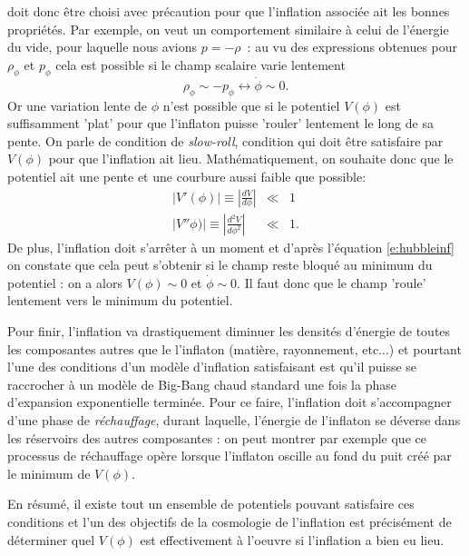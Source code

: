  doit donc être choisi avec précaution pour que l'inflation associée ait les bonnes propriétés. Par exemple, on veut un comportement similaire à celui de l'énergie du vide, pour laquelle nous avions $p=-\rho$~: au vu des expressions obtenues pour $\rho_\phi$ et $p_\phi$ cela est possible si le champ scalaire varie lentement
\begin{equation}
\rho_\phi\sim -p_\phi \leftrightarrow \dot \phi \sim 0.
\end{equation}
Or une variation lente de $\phi$ n'est possible que si le potentiel $V(\phi)$ est suffisamment 'plat' pour que l'inflaton puisse 'rouler' lentement le long de sa pente. On parle de condition de \textit{slow-roll}, condition qui doit être satisfaire par $V(\phi)$ pour que l'inflation ait lieu. Mathématiquement, on souhaite donc que le potentiel ait une pente et une courbure aussi faible que possible:
\begin{eqnarray}
|V'(\phi)|\equiv|\frac{d V}{d\phi}| &\ll& 1\\
|V''\phi)|\equiv|\frac{d ^2 V}{d\phi^2}| &\ll& 1.
\end{eqnarray}
De plus, l'inflation doit s'arrêter à un moment et d'après l'équation \ref{e:hubbleinf} on constate que cela peut s'obtenir si le champ reste bloqué au minimum du potentiel : on a alors $V(\phi)\sim 0$ et $\dot \phi \sim 0$. Il faut donc que le champ 'roule' lentement vers le minimum du potentiel. 

Pour finir, l'inflation va drastiquement diminuer les densités d'énergie de toutes les composantes autres que le l'inflaton (matière, rayonnement, etc...) et pourtant l'une des conditions d'un modèle d'inflation satisfaisant est qu'il puisse se raccrocher à un modèle de Big-Bang chaud standard une fois la phase d'expansion exponentielle terminée. Pour ce faire, l'inflation doit s'accompagner d'une phase de \textit{réchauffage}, durant laquelle, l'énergie de l'inflaton se déverse dans les réservoirs des autres composantes : on peut montrer par exemple que ce processus de réchauffage opère lorsque l'inflaton oscille au fond du puit créé par le minimum de $V(\phi)$.


En résumé, il existe tout un ensemble de potentiels pouvant satisfaire ces conditions et l'un des objectifs de la cosmologie de l'inflation est précisément de déterminer quel $V(\phi)$ est effectivement à l'oeuvre si l'inflation a bien eu lieu.



